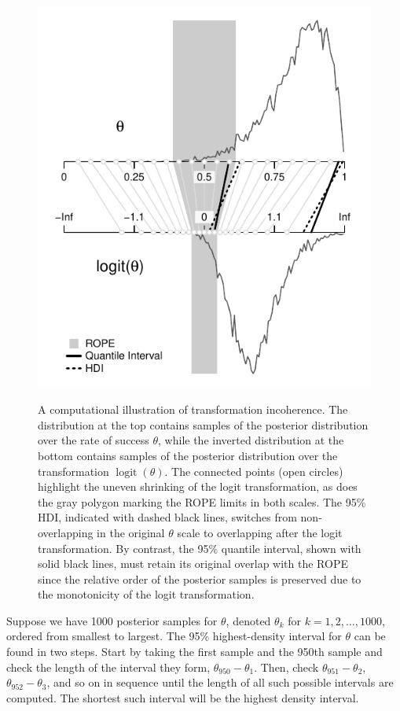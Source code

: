 \documentclass[9pt,twocolumn,twoside]{cidlab-draft}\templatetype{cidlab-invited}
\DeclareMathOperator*{\logit}{logit}
\begin{document}
\begin{figure}[t]
    \centering
    {\includegraphics[scale=1]{p/figure3.pdf}}
    \caption{A computational illustration of transformation incoherence.  The distribution at the top contains samples of the posterior distribution over the rate of success $\theta$, while the inverted distribution at the bottom contains samples of the posterior distribution over the transformation $\logit(\theta)$. The connected points (open circles) highlight the uneven shrinking of the logit transformation, as does the gray polygon marking the ROPE limits in both scales.
    The 95\% HDI, indicated with dashed black lines, switches from non-overlapping in the original $\theta$ scale to overlapping after the logit transformation.
    By contrast, the 95\% quantile interval, shown with solid black lines, must retain its original overlap with the ROPE since the relative order of the posterior samples is preserved due to the monotonicity of the logit transformation.}
    \label{fig:transformation}
\end{figure}

Suppose we have 1000 posterior samples for $\theta$, denoted $\theta_k$ for $k=1,2,\dots,1000$, ordered from smallest to largest. The 95\% highest-density interval for $\theta$ can be found in two steps. Start by taking the first sample and the 950th sample and check the length of the interval they form, $\theta_{950} - \theta_1$. Then, check $\theta_{951}-\theta_2$, $\theta_{952}-\theta_3$, and so on in sequence until the length of all such possible intervals are computed. The shortest such interval will be the highest density interval. 
\end{document}
